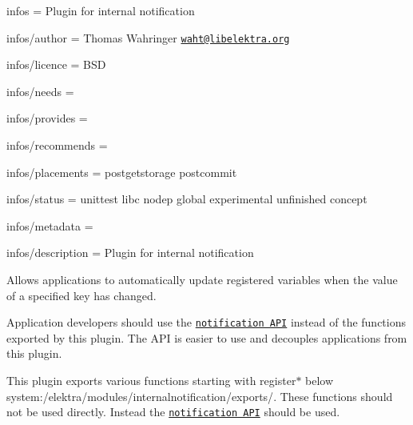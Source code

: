 
\begin{DoxyItemize}
\item infos = Plugin for internal notification
\item infos/author = Thomas Wahringer \href{mailto:waht@libelektra.org}{\tt waht@libelektra.\+org}
\item infos/licence = B\+SD
\item infos/needs =
\item infos/provides =
\item infos/recommends =
\item infos/placements = postgetstorage postcommit
\item infos/status = unittest libc nodep global experimental unfinished concept
\item infos/metadata =
\item infos/description = Plugin for internal notification
\end{DoxyItemize}

Allows applications to automatically update registered variables when the value of a specified key has changed.

Application developers should use the \href{https://doc.libelektra.org/api/latest/html/group__kdbnotification.html}{\tt notification A\+PI} instead of the functions exported by this plugin. The A\+PI is easier to use and decouples applications from this plugin.

This plugin exports various functions starting with {\ttfamily register$\ast$} below {\ttfamily system\+:/elektra/modules/internalnotification/exports/}. These functions should not be used directly. Instead the \href{https://doc.libelektra.org/api/latest/html/group__kdbnotification.html}{\tt notification A\+PI} should be used. 